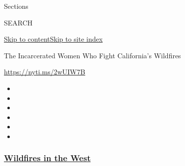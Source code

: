 Sections

SEARCH

\protect\hyperlink{site-content}{Skip to
content}\protect\hyperlink{site-index}{Skip to site index}

The Incarcerated Women Who Fight California's Wildfires

\url{https://nyti.ms/2wUIW7B}

\begin{itemize}
\item
\item
\item
\item
\item
\item
\end{itemize}

\hypertarget{wildfires-in-the-west}{%
\subsubsection{\texorpdfstring{\href{https://www.nytimes3xbfgragh.onion/spotlight/california-wildfires?name=styln-california-wildfires\&region=TOP_BANNER\&block=storyline_menu_recirc\&action=click\&pgtype=Article\&impression_id=8da7f380-f529-11ea-a612-19c737f1de2c\&variant=undefined}{Wildfires
in the West}}{Wildfires in the West}}\label{wildfires-in-the-west}}

